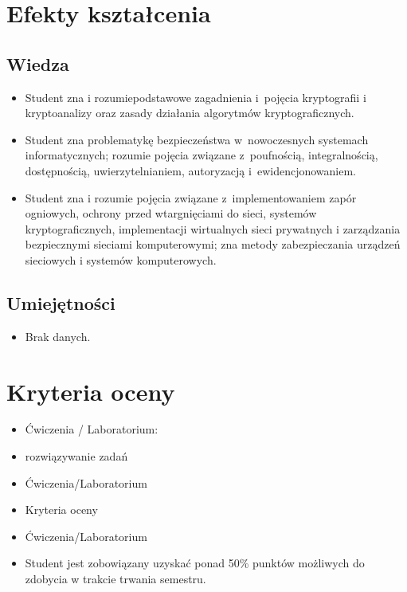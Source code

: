 \documentclass[12pt, a4paper]{article}
\begin{document}
\section{Efekty kształcenia}

\subsection*{Wiedza}
\begin{itemize}
  \item Student zna i rozumiepodstawowe zagadnienia i pojęcia kryptografii i kryptoanalizy oraz zasady działania algorytmów kryptograficznych.
  \item Student zna problematykę bezpieczeństwa w nowoczesnych systemach informatycznych; rozumie pojęcia związane z poufnością, integralnością, dostępnością, uwierzytelnianiem, autoryzacją i ewidencjonowaniem.
  \item Student zna i rozumie pojęcia związane z implementowaniem zapór ogniowych, ochrony przed wtargnięciami do sieci, systemów kryptograficznych, implementacji wirtualnych sieci prywatnych i zarządzania bezpiecznymi sieciami komputerowymi; zna metody zabezpieczania urządzeń sieciowych i systemów komputerowych.
\end{itemize}

\subsection*{Umiejętności}
\begin{itemize}
  \item Brak danych.
\end{itemize}

\section{Kryteria oceny}

\begin{itemize}
  \item Ćwiczenia / Laboratorium:
  \item rozwiązywanie zadań
  \item Ćwiczenia/Laboratorium
  \item Kryteria oceny
  \item Ćwiczenia/Laboratorium
  \item Student jest zobowiązany uzyskać ponad 50\% punktów możliwych do zdobycia w trakcie trwania semestru.
\end{itemize}
\end{document}
